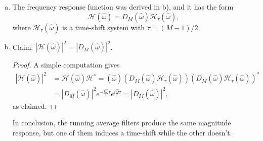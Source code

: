 \begin{enumerate}
\begin{enumerate}[a)]
\item The frequency response function was derived in b), and it has the form 
$$\mathcal{H}(\hat{\omega})=D_{M}(\hat{\omega})\mathcal{H}_{\tau}(\hat{\omega}),$$
where $\mathcal{H}_{\tau}(\hat{\omega})$ is a time-shift system with $\tau=(M-1)/2$. 

\item Claim: $|\mathcal{H}(\hat{\omega})|^{2}=|D_{M}(\hat{\omega})|^{2}$.
\begin{proof}
A simple computation gives
\begin{align*}
    |\mathcal{H}(\hat{\omega})|^{2}&=\mathcal{H}(\hat{\omega})\mathcal{H}^{*}=(\hat{\omega})(D_{M}(\hat{\omega})\mathcal{H}_{\tau}(\hat{\omega}))(D_{M}(\hat{\omega})\mathcal{H}_{\tau}(\hat{\omega}))^{*}\\
    &=|D_{M}(\hat{\omega})|^{2}e^{-i\hat{\omega}\tau}e^{i\hat{\omega}\tau}=|D_{M}(\hat{\omega})|^{2},
\end{align*}
as claimed. 
\end{proof}
In conclusion, the running average filters produce the same magnitude response, but one of them induces a time-shift while the other doesn't. 
\end{enumerate}



\end{enumerate}


